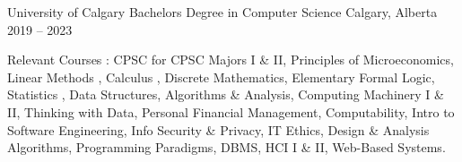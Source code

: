 \documentclass[]{awesome-cv}
\begin{document}
    
\makecvheader[C]

	
\vspace{-5mm}
\begin{cventries}
	\cventry
	{University of Calgary}
	{Bachelor\textquotesingle{}s Degree in Computer Science}
	{Calgary, Alberta}
	{2019 – 2023}
    {}
      \begin{cvparagraph} %
        {Relevant Courses : CPSC for CPSC Majors I \& II, Principles of Microeconomics, Linear Methods , Calculus , Discrete Mathematics, Elementary Formal Logic, Statistics , Data Structures, Algorithms \& Analysis, Computing Machinery I \& II, Thinking with Data, Personal Financial Management, Computability, Intro to Software Engineering, Info Security \& Privacy, IT Ethics, Design \& Analysis Algorithms, Programming Paradigms, DBMS, HCI I \& II, Web-Based Systems.}
      \end{cvparagraph}
     


\end{cventries}
\end{document}
